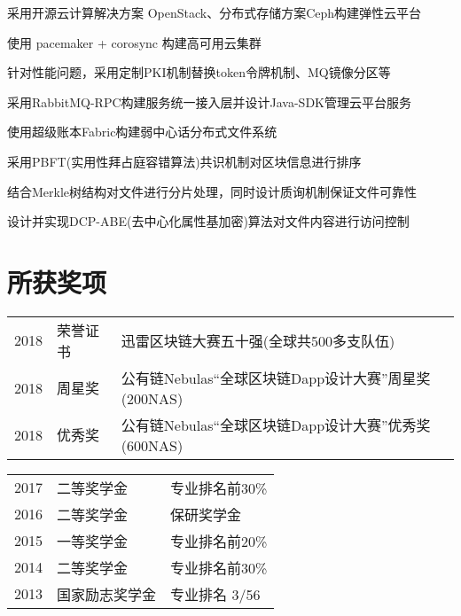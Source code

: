 \documentclass[]{deedy-resume-openfont}
\begin{document}
\begin{minipage}[t]{0.68\textwidth}
\begin{tightemize}
    \item 采用开源云计算解决方案 OpenStack、分布式存储方案Ceph构建弹性云平台
    \item 使用 pacemaker + corosync 构建高可用云集群
    \item 针对性能问题，采用定制PKI机制替换token令牌机制、MQ镜像分区等
    \item 采用RabbitMQ-RPC构建服务统一接入层并设计Java-SDK管理云平台服务
    \end{tightemize}
\sectionsep

\begin{tightemize}
    \item 使用超级账本Fabric构建弱中心话分布式文件系统
    \item 采用PBFT(实用性拜占庭容错算法)共识机制对区块信息进行排序
    \item 结合Merkle树结构对文件进行分片处理，同时设计质询机制保证文件可靠性
    \item 设计并实现DCP-ABE(去中心化属性基加密)算法对文件内容进行访问控制
    \end{tightemize}
\sectionsep

\section{所获奖项}
\begin{tabular}{rll}
2018         & 荣誉证书  & 迅雷区块链大赛五十强(全球共500多支队伍) \\
2018         & 周星奖 & 公有链Nebulas“全球区块链Dapp设计大赛”周星奖(200NAS) \\
2018         & 优秀奖 & 公有链Nebulas“全球区块链Dapp设计大赛”优秀奖(600NAS) \\
\end{tabular}
\begin{tabular}{rll}
2017         & 二等奖学金 & 专业排名前{30\%} \\
2016         & 二等奖学金 & 保研奖学金 \\
2015         & 一等奖学金 & 专业排名前{20\%} \\
2014         & 二等奖学金 & 专业排名前{30\%} \\
2013         & 国家励志奖学金  & 专业排名 {3/56} \\
\end{tabular}
\sectionsep


\sectionsep\end{minipage}
\end{document}
